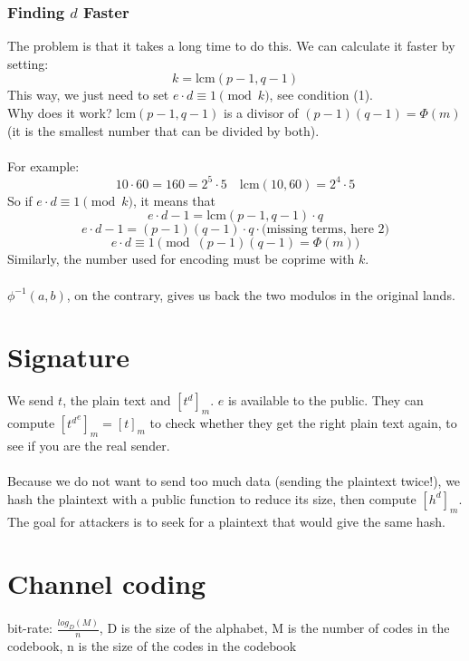 \documentclass{article}
\begin{document}
\subsubsection{Finding \( d \) Faster}

The problem is that it takes a long time to do this. We can calculate it faster by setting:
\[
k = \mathrm{lcm}(p - 1, q - 1)
\]
This way, we just need to set \( e \cdot d \equiv 1 \pmod{k} \), see condition (1).\\
Why does it work? \(\mathrm{lcm}(p - 1, q-1)\) is a divisor of \((p-1)(q-1) = \Phi(m)\) (it is the smallest number that can be divided by both).\\\\
For example:
\[
10 \cdot 60 = 160 = 2^5 \cdot 5 \quad \mathrm{lcm}(10, 60) = 2^4 \cdot 5
\]
So if \( e \cdot d \equiv 1 \pmod{k} \), it means that 
\[
e \cdot d - 1 = \mathrm{lcm}(p-1, q-1) \cdot q
\]
\[
e \cdot d - 1 = (p-1)(q-1) \cdot q \cdot \text{(missing terms, here 2)}
\]
\[
e \cdot d \equiv 1 \pmod{(p-1)(q-1) = \Phi(m)}
\]
Similarly, the number used for encoding must be coprime with \( k \).\\\\
\(\phi^{-1}(a, b)\), on the contrary, gives us back the two modulos in the original lands.

\newpage

\section{Signature}

We send $t$, the plain text and $[t^d]_m$. $e$ is available to the public. They can compute $[{t^d}^e]_m = [t]_m$ to check whether they get the right plain text again, to see if you are the real sender.\\\\
Because we do not want to send too much data (sending the plaintext twice!), we hash the plaintext with a public function to reduce its size, then compute $[h^d]_m$. The goal for attackers is to seek for a plaintext that would give the same hash.

\section{Channel coding}

bit-rate: $\frac{log_D(M)}{n}$, D is the size of the alphabet, M is the number of codes in the codebook, n is the size of the codes in the codebook
\end{document}
